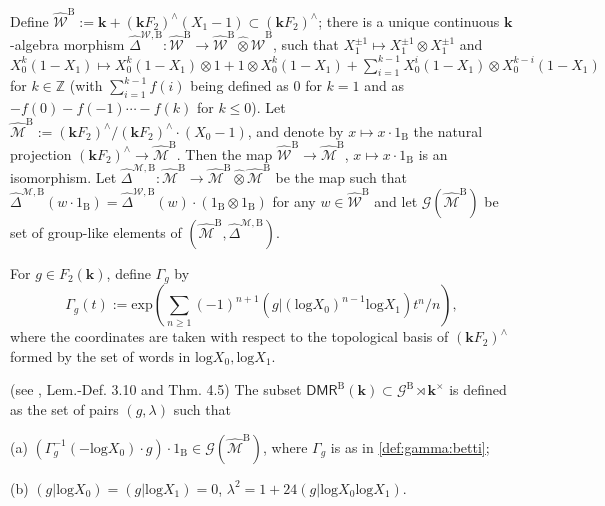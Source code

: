 \documentclass[10pt]{amsart}
\numberwithin{equation}{subsection}
\begin{document}
Define $\hat{\mathcal W}^{\mathrm B}:=\mathbf k+(\mathbf kF_2)^\wedge(X_1-1)\subset 
(\mathbf kF_2)^\wedge$; there is a unique continuous $\mathbf k$-algebra morphism 
$\hat\Delta^{\mathcal W,\mathrm B} : \hat{\mathcal W}^{\mathrm B}\to 
\hat{\mathcal W}^{\mathrm B}\hat\otimes
\hat{\mathcal W}^{\mathrm B}$, such that $X_1^{\pm1}\mapsto X_1^{\pm1}\otimes X_1^{\pm1}$ 
and $X_0^k(1-X_1)\mapsto X_0^k(1-X_1)\otimes1
+1\otimes X_0^k(1-X_1)+\sum_{i=1}^{k-1}X_0^i(1-X_1)\otimes X_0^{k-i}(1-X_1)$ for $k\in\mathbb Z$
(with $\sum_{i=1}^{k-1}f(i)$ being defined as $0$ for $k=1$ and 
as $-f(0)-f(-1)\cdots -f(k)$ for $k\leq0$). 
Let 
$\hat{\mathcal M}^{\mathrm B}:=(\mathbf kF_2)^\wedge/(\mathbf kF_2)^\wedge\cdot (X_0-1)$, 
and denote by $x\mapsto x\cdot 1_{\mathrm B}$ 
the natural projection $(\mathbf kF_2)^\wedge\to \hat{\mathcal M}^{\mathrm B}$. 
Then the map $\hat{\mathcal W}^{\mathrm B}\to \hat{\mathcal M}^{\mathrm B}$, $x\mapsto 
x\cdot 1_{\mathrm B}$ is an isomorphism. Let $\hat\Delta^{\mathcal M,\mathrm B} : 
\hat{\mathcal M}^{\mathrm B}\to 
\hat{\mathcal M}^{\mathrm B}\hat\otimes\hat{\mathcal M}^{\mathrm B}$ be the map such that 
$\hat\Delta^{\mathcal M,\mathrm B}(w\cdot 1_{\mathrm B})
=\hat\Delta^{\mathcal W,\mathrm B}(w)\cdot (1_{\mathrm B}\otimes 1_{\mathrm B})$
for any $w\in \hat{\mathcal W}^{\mathrm B}$
and let $\mathcal G(\hat{\mathcal M}^{\mathrm B})$ be set of group-like elements of 
$(\hat{\mathcal M}^{\mathrm B},\hat\Delta^{\mathcal M,\mathrm B})$. 

For $g\in F_2(\mathbf k)$, define $\Gamma_g$ 
by 
\begin{equation}\label{def:gamma:betti}
\textstyle\Gamma_g(t):=\mathrm{exp}(\sum_{n\geq 1}(-1)^{n+1}(g|(\mathrm{log}X_0)^{n-1}
\mathrm{log}X_1)t^n/n), 
\end{equation}
where the coordinates are taken with respect to the topological 
basis of $(\mathbf kF_2)^\wedge$ formed by the set of words in $\mathrm{log}X_0,\mathrm{log}X_1$. 

\begin{defn}\label{def:DMLR:betti} (see \cite{EF3}, Lem.-Def. 3.10 and Thm. 4.5)
The subset $\mathsf{DMR}^{\mathrm B}(\mathbf k)\subset \mathcal G^{\mathrm B}
\rtimes\mathbf k^\times$ is defined as the set of pairs $(g,\lambda)$ such that 

(a) $(\Gamma_g^{-1}(-\mathrm{log}X_0) \cdot g) 
\cdot 1_{\mathrm B} \in \mathcal G(\hat{\mathcal M}^{\mathrm B})$, where $\Gamma_g$ is as in 
\eqref{def:gamma:betti};

(b) $(g|\mathrm{log}X_0) = (g|\mathrm{log}X_1) = 0$, $\lambda^2 = 1 + 24(g|\mathrm{log}X_0\mathrm{log}X_1)$.
\end{defn}
\end{document}
